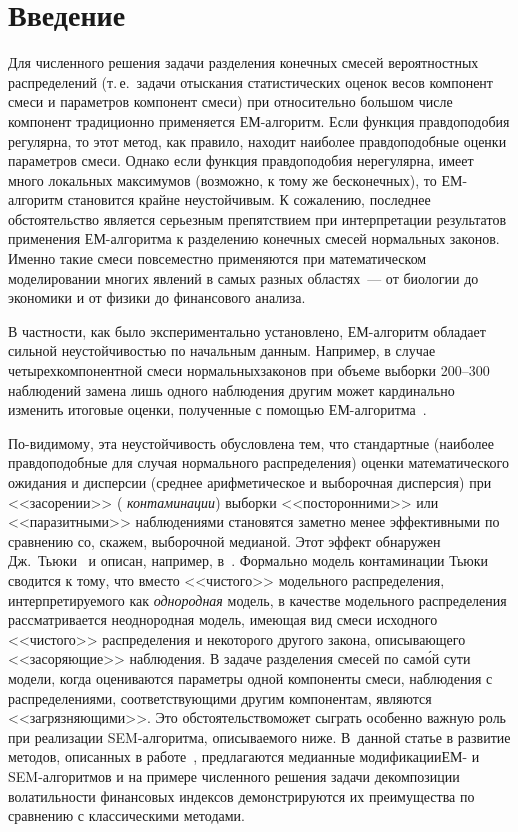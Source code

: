       \begin{multicols}{2}

      \label{st\stat}


\section{Введение}

Для численного решения задачи разделения конечных смесей
вероятностных распределений (т.\,е.\ задачи отыскания
статистических оценок весов компонент смеси и параметров компонент
смеси) при относительно большом числе компонент традиционно
применяется ЕМ-алгоритм. Если функция правдоподобия регулярна, то
этот метод, как правило, находит наиболее правдоподобные оценки
параметров смеси. Однако если функция правдоподобия нерегулярна,
имеет много локальных максимумов (возможно, к тому же
бесконечных), то ЕМ-алгоритм становится крайне неустойчивым. К
сожалению, последнее обстоятельство является серьезным
препятствием при интерпретации результатов применения ЕМ-алгоритма
к разделению конечных смесей нормальных законов. Именно такие
смеси повсеместно применяются при математическом моделировании
многих явлений в самых разных областях~--- от биологии до экономики
и от физики до финансового анализа.

В частности, как было экспериментально установлено, ЕМ-алгоритм
обладает сильной неустойчивостью по начальным данным. Например, в
случае четырехкомпонентной смеси нормальных\linebreak законов при объеме
выборки 200--300 наблюдений замена лишь одного наблюдения другим
может кардинально изменить итоговые оценки, полученные с помощью
ЕМ-алгоритма~\cite{Korolev2007b}.

По-видимому, эта неустойчивость обусловлена тем, что стандартные
(наиболее правдоподобные для случая нормального распределения)
оценки математического ожидания и дисперсии (среднее
арифметическое и выборочная дисперсия) при <<засорении>> ({\it
контаминации}) выборки <<посторонними>> или <<паразитными>>
наблюдениями становятся заметно менее эффективными по сравнению
со, скажем, выборочной медианой. Этот эффект обнаружен
Дж.~Тьюки~\cite{Tukey1960} и описан, например, в~\cite{Ayvazyan1983, Korolev2006}.
Формально модель контаминации Тьюки сводится
к тому, что вместо <<чистого>> модельного распределения,
интерпретируемого как {\it однородная} модель, в качестве
модельного распределения рассматривается неоднородная модель,
имеющая вид смеси исходного <<чистого>> распределения и некоторого
другого закона, описывающего <<за\-соря\-ющие>> наблюдения. В задаче
разделения смесей по сам\'{о}й сути модели, когда оцениваются
параметры одной компоненты смеси, наблюдения с распределениями,
соответствующими другим компонентам, являются <<загрязняющими>>.
Это обстоятельство\linebreak может сыграть особенно важную роль при
реали\-зации SEM-алгоритма, описываемого ниже. В~данной статье в
развитие методов, описанных в работе~\cite{GKT2008}, предлагаются
медианные модификации\linebreak ЕМ- и SEM-алгоритмов и на примере численного
решения задачи декомпозиции волатильности финансовых индексов
демонстрируются их преимущества по сравнению с классическими
методами.


\end{multicols}
